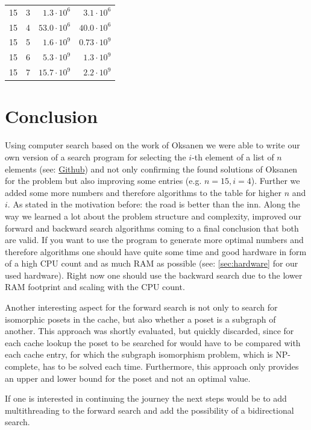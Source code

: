 \documentclass[10pt,journal,compsoc]{IEEEtran}
\begin{document}
\begin{table}[!t]
\begin{tabular}{c|c|r|r}
    15  & 3   & $1.3 \cdot 10^6$        & $3.1 \cdot 10^6$         \\
    15  & 4   & $53.0 \cdot 10^6$       & $40.0 \cdot 10^6$        \\
    15  & 5   & $1.6 \cdot 10^9$        & $0.73 \cdot 10^9$        \\
    15  & 6   & $5.3 \cdot 10^9$        & $1.3 \cdot 10^9$         \\
    15  & 7   & $15.7 \cdot 10^9$       & $2.2 \cdot 10^9$         \\
  \end{tabular}
\end{table}


\section{Conclusion}

Using computer search based on the work of Oksanen we were able to write our own
version of a search program for selecting the $i$-th element of a list of $n$
elements (see: \href{https://github.com/JGDoerrer/selection_generator}{Github})
and not only confirming the found solutions of Oksanen for the problem but also
improving some entries (e.g. $n = 15, i = 4$). Further we added some more
numbers and therefore algorithms to the table for higher $n$ and $i$. As stated
in the motivation before: the road is better than the inn. Along the way we
learned a lot about the problem structure and complexity, improved our forward
and backward search algorithms coming to a final conclusion that both are valid.
If you want to use the program to generate more optimal numbers and therefore
algorithms one should have quite some time and good hardware in form of a high
CPU count and as much RAM as possible (see: \ref{sec:hardware} for our used
hardware).
Right now one should use the backward search due to the lower RAM footprint and
scaling with the CPU count.

Another interesting aspect for the forward search is not only to search for
isomorphic posets in the cache, but also whether a poset is a subgraph of
another. This approach was shortly evaluated, but quickly discarded, since for
each cache lookup the poset to be searched for would have to be compared with
each cache entry, for which the subgraph isomorphism problem, which is
NP-complete, has to be solved each time. Furthermore, this approach only
provides an upper and lower bound for the poset and not an optimal value.

If one is interested in continuing the journey the next steps would be to add
multithreading to the forward search and add the possibility of a bidirectional
search.
\end{document}
